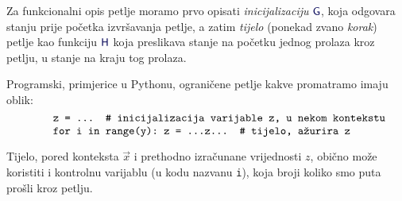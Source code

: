 
Za funkcionalni opis petlje moramo prvo opisati \emph{inicijalizaciju} $\f G$, koja odgovara stanju prije početka izvršavanja petlje, a zatim \emph{tijelo} (ponekad zvano \emph{korak}) petlje kao funkciju $\f H$ koja preslikava stanje na početku jednog prolaza kroz petlju, u stanje na kraju tog prolaza. %

Programski, primjerice u Pythonu, ograničene petlje kakve promatramo imaju oblik:
\begin{equation}
	\begin{minipage}{0.8\textwidth}
\begin{verbatim}
z = ...  # inicijalizacija varijable z, u nekom kontekstu
for i in range(y): z = ...z...  # tijelo, ažurira z
\end{verbatim}
	\end{minipage}
\end{equation}

Tijelo, pored konteksta $\vec x$ i prethodno izračunane vrijednosti $z$, obično može koristiti i kontrolnu varijablu (u kodu nazvanu \texttt i), koja broji koliko smo puta prošli kroz petlju.


